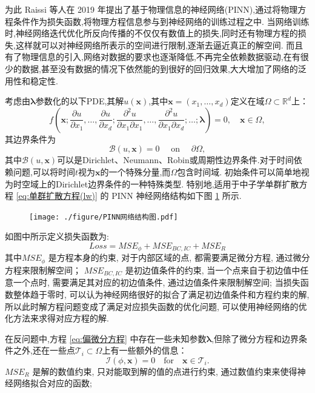 \documentclass{Sichuan Normal University}
\begin{document}
为此 Raissi 等人在 2019 年提出了基于物理信息的神经网络(PINN)\cite{raissiPhysicsinformedNeuralNetworks2019},通过将物理方程条件作为损失函数,将物理方程信息参与到神经网络的训练过程之中.
当网络训练时,神经网络迭代优化所反向传播的不仅仅有数值上的损失,同时还有物理方程的损失,这样就可以对神经网络所表示的空间进行限制,逐渐去逼近真正的解空间.
而且有了物理信息的引入,网络对数据的要求也逐渐降低,不再完全依赖数据驱动,在有很少的数据,甚至没有数据的情况下依然能的到很好的回归效果,大大增加了网络的泛用性和稳定性.

考虑由$\boldsymbol{\lambda}$参数化的以下PDE,其解$u(\mathbf{x})$,其中$\mathbf{x}=\left(x_1, \ldots, x_d\right)$定义在域$\Omega \subset \mathbb{R}^d$上：
\begin{equation}
f\left(\mathbf{x} ; \frac{\partial u}{\partial x_1}, \ldots, \frac{\partial u}{\partial x_d} ; \frac{\partial^2 u}{\partial x_1 \partial x_1}, \ldots, \frac{\partial^2 u}{\partial x_1 \partial x_d} ; \ldots ; \boldsymbol{\lambda}\right)=0, \quad \mathbf{x} \in \Omega,
\label{eq:偏微分方程}
\end{equation}
其边界条件为
\begin{equation}
\mathcal{B}(u, \mathbf{x})=0 \quad \text { on } \quad \partial \Omega,
\end{equation}
其中$\mathcal{B}(u, \mathbf{x})$可以是Dirichlet、Neumann、Robin或周期性边界条件.对于时间依赖问题,可以将时间$t$视为$\mathbf{x}$的一个特殊分量,而$\Omega$包含时间域.
初始条件可以简单地视为时空域上的Dirichlet边界条件的一种特殊类型.
特别地,适用于中子学单群扩散方程 \eqref{eq:单群扩散方程(lw)} 的 PINN 神经网络结构如下图 \ref{fig:PINN Network Structure} 所示.
\begin{figure}[H]
    \centering
    \texttt{[image: ./figure/PINN网络结构图.pdf]}
    \label{fig:PINN Network Structure}
    \end{figure}
如图中所示定义损失函数为:
\begin{equation}
    Loss =M S E_\phi+M S E_{B C, I C}+M S E_R
    \label{eq:损失函数}  
\end{equation}其中$M S E_\phi$ 是方程本身的约束, 对于内部区域的点, 都需要满足微分方程, 通过微分方程来限制解空间；
$M S E_{B C, I C}$ 是初边值条件的约束, 当一个点来自于初边值中任意一个点时, 需要满足其对应的初边值条件, 通过边值条件来限制解空间; 
当损失函数整体趋于零时, 可以认为神经网络很好的拟合了满足初边值条件和方程约束的解, 所以此时解方程问题变成了满足对应损失函数的优化问题, 可以使用神经网络的优化方法来求得对应方程的解.

在反问题中,方程 \eqref{eq:偏微分方程} 中存在一些未知参数$\boldsymbol{\lambda}$,但除了微分方程和边界条件之外,还在一些点$\mathcal{T}_i \subset \Omega$上有一些额外的信息：
\begin{equation}
\mathcal{I}(\phi, \mathbf{x})=0 \quad \text{for} \quad \mathbf{x} \in \mathcal{T}_i .
\end{equation}
$M S E_R$ 是解的数值约束, 只对能取到解的值的点进行约束, 通过数值约束来使得神经网络拟合对应的函数; 
\end{document}

